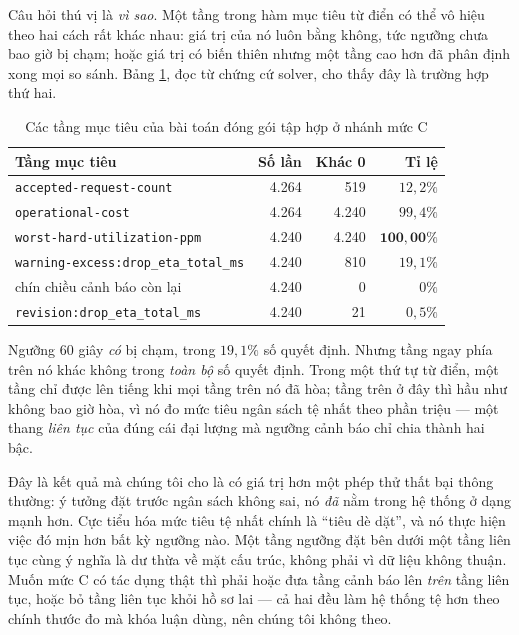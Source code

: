 Câu hỏi thú vị là \emph{vì sao}. Một tầng trong hàm mục tiêu từ điển có thể vô hiệu theo hai
cách rất khác nhau: giá trị của nó luôn bằng không, tức ngưỡng chưa bao giờ bị chạm; hoặc giá
trị có biến thiên nhưng một tầng cao hơn đã phân định xong mọi so sánh. Bảng \ref{bang:tang},
đọc từ chứng cứ solver, cho thấy đây là trường hợp thứ hai.

\begin{table}[htbp]
\centering
\caption{Các tầng mục tiêu của bài toán đóng gói tập hợp ở nhánh mức C}
\label{bang:tang}
\small
\begin{tabular}{@{}lrrr@{}}
\toprule
\textbf{Tầng mục tiêu} & \textbf{Số lần} & \textbf{Khác 0} & \textbf{Tỉ lệ}\\
\midrule
\texttt{accepted-request-count} & 4.264 & 519 & $12{,}2\%$\\
\texttt{operational-cost} & 4.264 & 4.240 & $99{,}4\%$\\
\texttt{worst-hard-utilization-ppm} & 4.240 & 4.240 & $\mathbf{100{,}00\%}$\\
\texttt{warning-excess:drop\_eta\_total\_ms} & 4.240 & 810 & $19{,}1\%$\\
chín chiều cảnh báo còn lại & 4.240 & 0 & $0\%$\\
\texttt{revision:drop\_eta\_total\_ms} & 4.240 & 21 & $0{,}5\%$\\
\bottomrule
\end{tabular}
\end{table}

Ngưỡng 60 giây \emph{có} bị chạm, trong $19{,}1\%$ số quyết định. Nhưng tầng ngay phía trên nó
khác không trong \emph{toàn bộ} số quyết định. Trong một thứ tự từ điển, một tầng chỉ được lên
tiếng khi mọi tầng trên nó đã hòa; tầng trên ở đây thì hầu như không bao giờ hòa, vì nó đo mức
tiêu ngân sách tệ nhất theo phần triệu --- một thang \emph{liên tục} của đúng cái đại lượng mà
ngưỡng cảnh báo chỉ chia thành hai bậc.

Đây là kết quả mà chúng tôi cho là có giá trị hơn một phép thử thất bại thông thường: ý tưởng
đặt trước ngân sách không sai, nó \emph{đã} nằm trong hệ thống ở dạng mạnh hơn. Cực tiểu hóa mức
tiêu tệ nhất chính là ``tiêu dè dặt'', và nó thực hiện việc đó mịn hơn bất kỳ ngưỡng nào. Một
tầng ngưỡng đặt bên dưới một tầng liên tục cùng ý nghĩa là dư thừa về mặt cấu trúc, không phải
vì dữ liệu không thuận. Muốn mức C có tác dụng thật thì phải hoặc đưa tầng cảnh báo lên
\emph{trên} tầng liên tục, hoặc bỏ tầng liên tục khỏi hồ sơ lai --- cả hai đều làm hệ thống tệ
hơn theo chính thước đo mà khóa luận dùng, nên chúng tôi không theo.

